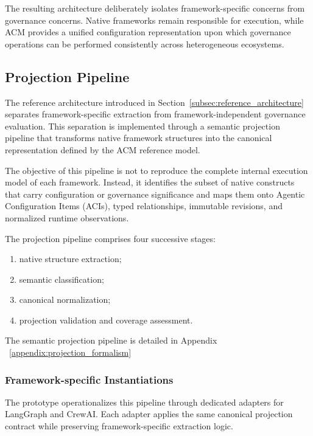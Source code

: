 \documentclass[10pt]{article}
\begin{document}
The resulting architecture deliberately isolates framework-specific concerns from governance concerns. Native frameworks remain responsible for execution, while ACM provides a unified configuration representation upon which governance operations can be performed consistently across heterogeneous ecosystems.

\subsection{Projection Pipeline}
\label{subsec:semantic_projection_pipeline}

The reference architecture introduced in
Section~\ref{subsec:reference_architecture} separates framework-specific
extraction from framework-independent governance evaluation. This separation is
implemented through a semantic projection pipeline that transforms native
framework structures into the canonical representation defined by the ACM
reference model.

The objective of this pipeline is not to reproduce the complete internal
execution model of each framework. Instead, it identifies the subset of native
constructs that carry configuration or governance significance and maps them
onto Agentic Configuration Items (ACIs), typed relationships, immutable
revisions, and normalized runtime observations.

The projection pipeline comprises four successive stages:

\begin{enumerate}
    \item native structure extraction;
    \item semantic classification;
    \item canonical normalization;
    \item projection validation and coverage assessment.
\end{enumerate}

The semantic projection pipeline is detailed in Appendix ~\ref{appendix:projection_formalism}


\subsubsection{Framework-specific Instantiations}

The prototype operationalizes this pipeline through dedicated adapters for
LangGraph and CrewAI. Each adapter applies the same canonical projection
contract while preserving framework-specific extraction logic.
\end{document}
